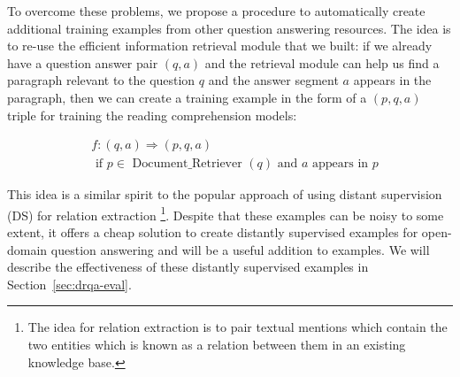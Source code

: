 To overcome these problems, we propose a procedure to automatically create additional training examples from other question answering resources. The idea is to re-use the efficient information retrieval module that we built: if we already have a question answer pair $(q, a)$ and the retrieval module can help us find a paragraph relevant to the question $q$ and the answer segment $a$ appears in the paragraph, then we can create a  training example in the form of a $(p, q, a)$ triple for training the reading comprehension models:

\begin{eqnarray}
   & f: (q, a) \Longrightarrow (p, q, a) \\
    & \text{ if } p \in \text{ Document\_Retriever }(q) \text{ and } a \text{ appears in } p \nonumber
\end{eqnarray}

This idea is a similar spirit to the popular approach of using distant supervision (DS) for relation extraction \cite{mintz2009distant} \footnote{The idea for relation extraction is to pair textual mentions which contain the two entities which is known as a relation between them in an existing knowledge base.}. Despite that these examples can be noisy to some extent, it offers a cheap solution to create distantly supervised examples for open-domain question answering and will be a useful addition to  examples. We will describe the effectiveness of these distantly supervised examples in Section~\ref{sec:drqa-eval}.
